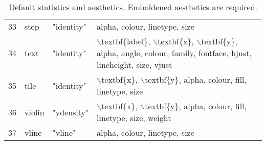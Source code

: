 \begin{table}[ht]
\begin{tabular}{rlll}
  33 & step & "identity" & alpha, colour, linetype, size \\ 
  34 & text & "identity" & $\backslash$textbf\{label\}, $\backslash$textbf\{x\}, $\backslash$textbf\{y\}, alpha, angle, colour, family, fontface, hjust, lineheight, size, vjust \\ 
  35 & tile & "identity" & $\backslash$textbf\{x\}, $\backslash$textbf\{y\}, alpha, colour, fill, linetype, size \\ 
  36 & violin & "ydensity" & $\backslash$textbf\{x\}, $\backslash$textbf\{y\}, alpha, colour, fill, linetype, size, weight \\ 
  37 & vline & "vline" & alpha, colour, linetype, size \\ 
   \hline
\end{tabular}
\caption{Default statistics and aesthetics. 
             Emboldened aesthetics are required.} 
\label{geom-aesthetics}
\end{table}
